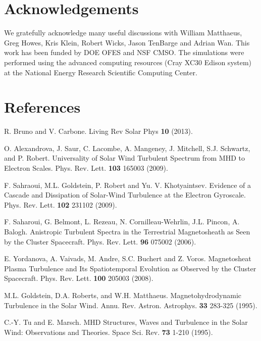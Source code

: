 \documentclass[aps,prl,amsmath,amssymb,reprint,superscriptaddress]{revtex4-1} %
\begin{document}
\section*{Acknowledgements}
  We gratefully acknowledge many useful discussions with William Matthaeus, Greg Howes, Kris Klein, Robert Wicks, Jason TenBarge and Adrian Wan. This work has been funded by DOE OFES and NSF CMSO.  The simulations were performed using the advanced computing resources (Cray XC30 Edison system) at the National Energy Research Scientific Computing Center.
\section*{References}
\begin{thebibliography}{99}

R. Bruno and V. Carbone. Living Rev Solar Phys {\bf 10} (2013).

 O. Alexandrova, J. Saur, C. Lacombe, A. Mangeney, J. Mitchell, S.J. Schwartz, and P. Robert. Universality of Solar Wind Turbulent Spectrum from MHD to Electron Scales. Phys. Rev. Lett. {\bf 103} 165003 (2009).

 F. Sahraoui, M.L. Goldstein, P. Robert and Yu. V. Khotyaintsev. Evidence of a Cascade and Dissipation of Solar-Wind Turbulence at the Electron Gyroscale. Phys. Rev. Lett. {\bf 102} 231102 (2009).

 F. Saharoui, G. Belmont, L. Rezeau, N. Cornilleau-Wehrlin, J.L. Pincon, A. Balogh. Anistropic Turbulent Spectra in the Terrestrial Magnetosheath as Seen by the Cluster Spacecraft. Phys. Rev. Lett. {\bf 96} 075002 (2006).

 E. Yordanova, A. Vaivads, M. Andre, S.C. Buchert and Z. Voros. Magnetosheat Plasma Turbulence and Its Spatiotemporal Evolution as Observed by the Cluster Spacecraft. Phys. Rev. Lett. {\bf 100} 205003 (2008).

 M.L. Goldstein, D.A. Roberts, and W.H. Matthaeus. Magnetohydrodynamic Turbulence in the Solar Wind. Annu. Rev. Astron. Astrophys. {\bf 33} 283-325 (1995).

 C.-Y. Tu and E. Marsch. MHD Structures, Waves and Turbulence in the Solar Wind: Observations and Theories. Space Sci. Rev. {\bf 73} 1-210 (1995).


\end{thebibliography}
\end{document}
